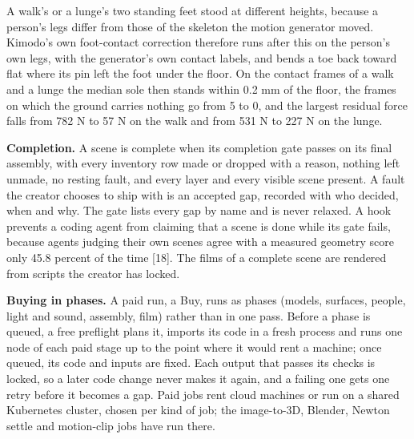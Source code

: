 \documentclass[
  11pt,
]{article}
\begin{document}
A walk's or a lunge's two standing feet stood at different heights,
because a person's legs differ from those of the skeleton the motion
generator moved. Kimodo's own foot-contact correction therefore runs
after this on the person's own legs, with the generator's own contact
labels, and bends a toe back toward flat where its pin left the foot
under the floor. On the contact frames of a walk and a lunge the median
sole then stands within 0.2 mm of the floor, the frames on which the
ground carries nothing go from 5 to 0, and the largest residual force
falls from 782 N to 57 N on the walk and from 531 N to 227 N on the
lunge.

\begin{center}\end{center}

\textbf{Completion.} A scene is complete when its completion gate passes
on its final assembly, with every inventory row made or dropped with a
reason, nothing left unmade, no resting fault, and every layer and every
visible scene present. A fault the creator chooses to ship with is an
accepted gap, recorded with who decided, when and why. The gate lists
every gap by name and is never relaxed. A hook prevents a coding agent
from claiming that a scene is done while its gate fails, because agents
judging their own scenes agree with a measured geometry score only 45.8
percent of the time {[}18{]}. The films of a complete scene are rendered
from scripts the creator has locked.

\textbf{Buying in phases.} A paid run, a Buy, runs as phases (models,
surfaces, people, light and sound, assembly, film) rather than in one
pass. Before a phase is queued, a free preflight plans it, imports its
code in a fresh process and runs one node of each paid stage up to the
point where it would rent a machine; once queued, its code and inputs
are fixed. Each output that passes its checks is locked, so a later code
change never makes it again, and a failing one gets one retry before it
becomes a gap. Paid jobs rent cloud machines or run on a shared
Kubernetes cluster, chosen per kind of job; the image-to-3D, Blender,
Newton settle and motion-clip jobs have run there.
\end{document}
